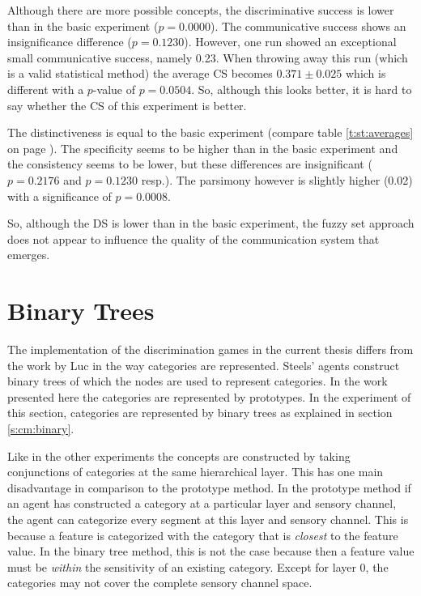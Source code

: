 Although there are more possible concepts, the discriminative success is lower than in the basic experiment ($p=0.0000$). The communicative success shows an insignificance difference ($p=0.1230$). However,  one run showed an exceptional small communicative success, namely 0.23. When throwing away this run (which is a valid statistical method) the average CS becomes $0.371 \pm 0.025$ which is different with a $p$-value of $p=0.0504$. So, although this looks better, it is hard to say whether the CS of this experiment is better. 

The distinctiveness is equal to the basic experiment (compare table \ref{t:st:averages} on page \pageref{t:st:averages}). The specificity seems to be higher than in the basic experiment and the consistency seems to be lower, but these differences are insignificant ($p=0.2176$ and $p=0.1230$ resp.). The parsimony however is slightly higher (0.02) with a significance of $p=0.0008$.

So, although the DS is lower than in the basic experiment, the fuzzy set approach does not appear to influence the quality of the communication system that emerges. 

\section{Binary Trees}\label{s:cat:bin}

The implementation of the discrimination games in the current thesis differs from the work by Luc  in the way categories are represented. Steels' agents construct binary trees of which the nodes are used to represent categories. In the work presented here the categories are represented by prototypes. In the experiment of this section, categories are represented by binary trees as explained in section \ref{s:cm:binary}. 

Like in the other experiments the concepts are constructed by taking conjunctions of categories at the same hierarchical layer. This has one main disadvantage in comparison to the prototype method. In the prototype method if an agent has constructed a category at a particular layer and sensory channel, the agent can categorize every segment at this layer and sensory channel. This is because a feature is categorized with the category that is {\em closest} to the feature value. In the binary tree method, this is not the case because then a feature value must be {\em within} the sensitivity of an existing category. Except for layer 0, the categories may not cover the complete sensory channel space.

